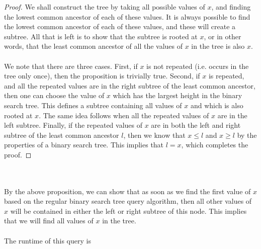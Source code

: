 \documentclass[12pt]{article}
\begin{document}
  \begin{proof}
    We shall construct the tree by taking all possible values of $x$, and finding the lowest common ancestor of each of these values. It is always possible to find the lowest common ancestor of each of these values, and these will create a subtree. All that is left is to show that the subtree is rooted at $x$, or in other words, that the least common ancestor of all the values of $x$ in the tree is also $x$. \\ \\
We note that there are three cases. First, if $x$ is not repeated (i.e. occurs in the tree only once), then the proposition is trivially true. Second, if $x$ is repeated, and all the repeated values are in the right subtree of the least common ancestor, then one can choose the value of $x$ which has the largest height in the binary search tree. This defines a subtree containing all values of $x$ and which is also rooted at $x$. The same idea follows when all the repeated values of $x$ are in the left subtree. Finally, if the repeated values of $x$ are in both the left and right subtree of the least common ancestor $l$, then we know that $x \leq l$ and $x \geq l$ by the properties of a binary search tree. This implies that $l = x$, which completes the proof.
  \end{proof} \\ \\
By the above proposition, we can show that as soon as we find the first value of $x$ based on the regular binary search tree query algorithm, then all other values of $x$ will be contained in either the left or right subtree of this node. This implies that we will find all values of $x$ in the tree. \\ \\
  The runtime of this query is
\end{document}
